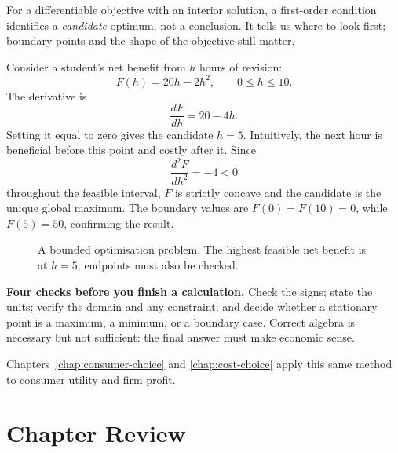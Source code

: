 For a differentiable objective with an interior solution, a first-order
condition identifies a \emph{candidate} optimum, not a conclusion. It tells
us where to look first; boundary points and the shape of the objective still
matter.

Consider a student's net benefit from $h$ hours of revision:
\[
F(h)=20h-2h^2,
\qquad 0\leq h\leq10.
\]
The derivative is
\[
\frac{dF}{dh}=20-4h.
\]
Setting it equal to zero gives the candidate $h=5$. Intuitively, the next
hour is beneficial before this point and costly after it. Since
\[
\frac{d^2F}{dh^2}=-4<0
\]
throughout the feasible interval, $F$ is strictly concave and the candidate
is the unique global maximum. The boundary values are $F(0)=F(10)=0$, while
$F(5)=50$, confirming the result.

\begin{figure}[!ht]
\centering
{}
\caption{A bounded optimisation problem. The highest feasible net benefit is
at $h=5$; endpoints must also be checked.}
\label{fig:bounded-optimisation}
\end{figure}

\begin{keyidea}
\textbf{Four checks before you finish a calculation.} Check the signs; state
the units; verify the domain and any constraint; and decide whether a
stationary point is a maximum, a minimum, or a boundary case. Correct algebra
is necessary but not sufficient: the final answer must make economic sense.
\end{keyidea}

Chapters~\ref{chap:consumer-choice} and \ref{chap:cost-choice} apply this
same method to consumer utility and firm profit.

\section*{Chapter Review}

